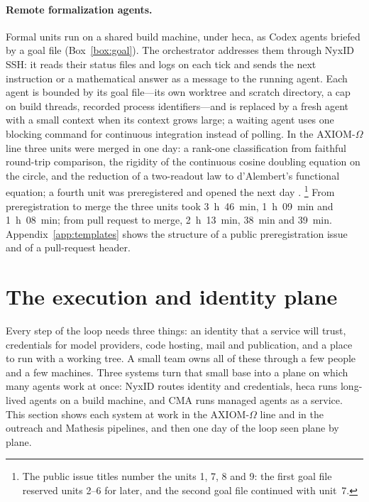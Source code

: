 \documentclass[11pt]{article}
\begin{document}
\paragraph{Remote formalization agents.} Formal units run on a shared build
machine, under heca, as Codex agents briefed by a goal file
(Box~\ref{box:goal}). The orchestrator addresses them through NyxID SSH: it
reads their status files and logs on each tick and sends the next instruction
or a mathematical answer as a message to the running agent. Each agent is
bounded by its goal file---its own worktree and scratch directory, a cap on
build threads, recorded process identifiers---and is replaced by a fresh
agent with a small context when its context grows large; a waiting agent uses
one blocking command for continuous integration instead of polling. In the
AXIOM-$\Omega$ line three units were merged in one day: a rank-one
classification from faithful round-trip comparison, the rigidity of the
continuous cosine doubling equation on the circle, and the reduction of a
two-readout law to d'Alembert's functional equation; a fourth unit was
preregistered and opened the next day \citep{prereg31739,axiomprs}.%
\footnote{The public issue titles number the units 1, 7, 8 and 9: the first
goal file reserved units 2--6 for later, and the second goal file continued
with unit~7.} From preregistration to merge the three units took 3~h~46~min,
1~h~09~min and 1~h~08~min; from pull request to merge, 2~h~13~min, 38~min and
39~min. Appendix~\ref{app:templates} shows the structure of a public
preregistration issue and of a pull-request header.

\section{The execution and identity plane}
\label{sec:plane}
Every step of the loop needs three things: an identity that a service will
trust, credentials for model providers, code hosting, mail and publication,
and a place to run with a working tree. A small team owns all of these
through a few people and a few machines. Three systems turn that small base
into a plane on which many agents work at once: NyxID routes identity and
credentials, heca runs long-lived agents on a build machine, and CMA runs
managed agents as a service. This section shows each system at work in the
AXIOM-$\Omega$ line and in the outreach and Mathesis pipelines, and then one
day of the loop seen plane by plane.
\end{document}
